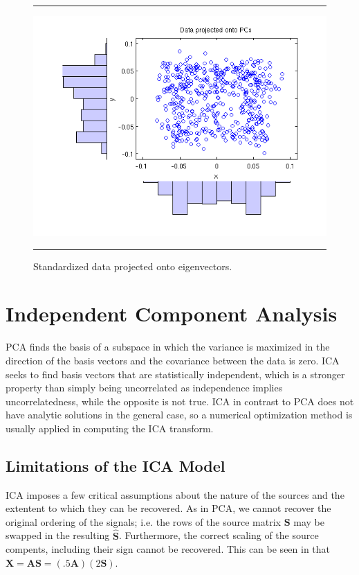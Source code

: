 \documentclass[11pt, oneside, a4paper]{report}
\begin{document}
\begin{figure}
  \centering
  \hrule
  \includegraphics[width = .9\textwidth]{Figures/pca_eig_projection}
  \hrule
  \caption{Standardized data projected onto eigenvectors.}
\end{figure}

\chapter{Independent Component Analysis}\label{ica}


PCA finds the basis of a subspace in which the variance is
maximized in the direction of the basis vectors and the covariance
between the data is zero. ICA seeks to find basis
vectors that are statistically independent, which is a stronger
property than simply being uncorrelated as independence implies
uncorrelatedness, while the opposite is not true. ICA in contrast to PCA does not have analytic solutions in the general case, so a numerical optimization method is usually applied in computing the ICA transform.


\section{Limitations of the ICA Model}\label{ICA_restrictions}

ICA imposes a few critical assumptions about the nature of the sources
and the extentent to which they can be recovered. As in PCA, we cannot
recover the original ordering of the signals; i.e. the rows of the
source matrix $\boldsymbol{S}$ may be swapped in the resulting
$\hat{\boldsymbol{S}}$. Furthermore, the correct scaling of the source
compents, including their sign cannot be recovered. This can be seen
in that $\boldsymbol{X} = \boldsymbol{A}\boldsymbol{S} = (.5
\boldsymbol{A})(2 \boldsymbol{S})$.
\end{document}
